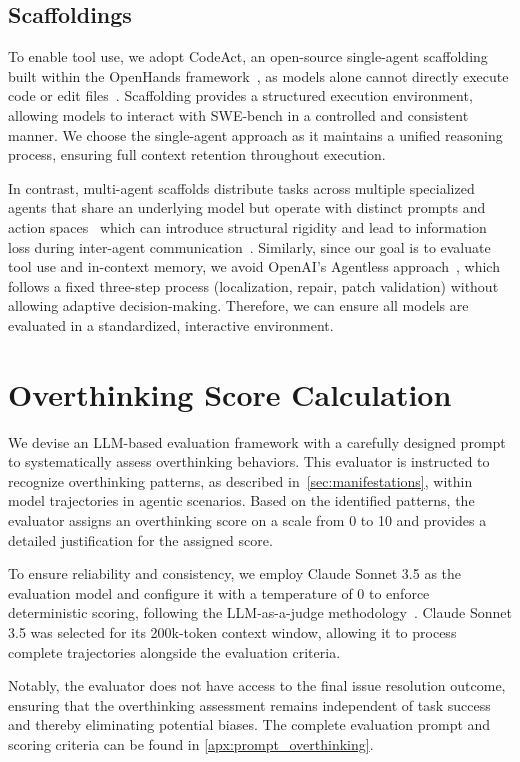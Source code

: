 \subsection{Scaffoldings}
To enable tool use, we adopt CodeAct, an open-source single-agent scaffolding built within the OpenHands framework~\cite{openhands}, as models alone cannot directly execute code or edit files~\cite{qwq-32b-preview, openai_o1_mini, openai_o1_system_card_2024, deepseekai2025deepseekr1incentivizingreasoningcapability, sky_t1_2025}. Scaffolding provides a structured execution environment, allowing models to interact with SWE-bench in a controlled and consistent manner. We choose the single-agent approach as it maintains a unified reasoning process, ensuring full context retention throughout execution.

In contrast, multi-agent scaffolds distribute tasks across multiple specialized agents that share an underlying model but operate with distinct prompts and action spaces~\cite{chen2024coderissueresolvingmultiagent,xia2024agentlessdemystifyingllmbasedsoftware, phan2024hyperagentgeneralistsoftwareengineering, allhands_single_agent_systems} which can introduce structural rigidity and lead to information loss during inter-agent communication~\cite{allhands_single_agent_systems}. Similarly, since our goal is to evaluate tool use and in-context memory, we avoid OpenAI's Agentless approach~\cite{openai_o1_system_card_2024, xia2024agentlessdemystifyingllmbasedsoftware}, which follows a fixed three-step process (localization, repair, patch validation) without allowing adaptive decision-making. Therefore, we can ensure all models are evaluated in a standardized, interactive environment.

\section{Overthinking Score Calculation}
\label{sec:score_calc}

We devise an LLM-based evaluation framework with a carefully designed prompt to systematically assess overthinking behaviors. This evaluator is instructed to recognize overthinking patterns, as described in~\autoref{sec:manifestations}, within model trajectories in agentic scenarios. Based on the identified patterns, the evaluator assigns an overthinking score on a scale from 0 to 10 and provides a detailed justification for the assigned score.

To ensure reliability and consistency, we employ Claude Sonnet 3.5 as the evaluation model and configure it with a temperature of 0 to enforce deterministic scoring, following the LLM-as-a-judge methodology~\cite{zheng2023judgingllmasajudgemtbenchchatbot}. Claude Sonnet 3.5 was selected for its 200k-token context window, allowing it to process complete trajectories alongside the evaluation criteria.

Notably, the evaluator does not have access to the final issue resolution outcome, ensuring that the overthinking assessment remains independent of task success and thereby eliminating potential biases. The complete evaluation prompt and scoring criteria can be found in \cref{apx:prompt_overthinking}.